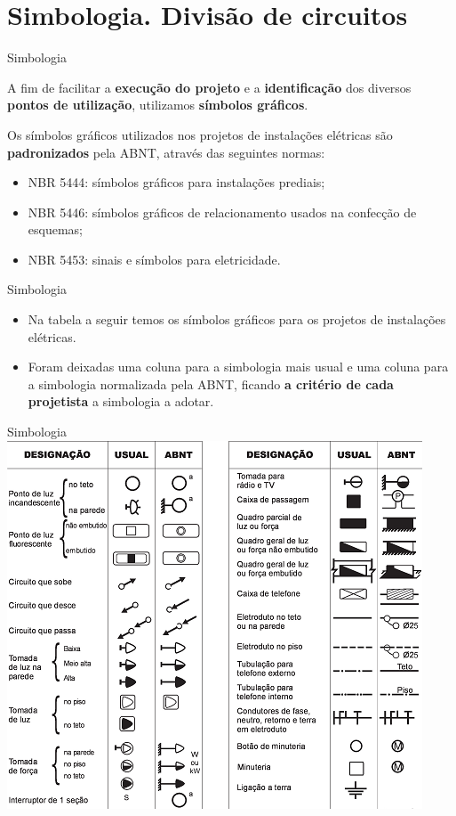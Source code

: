 \section{Simbologia. Divisão de circuitos}

\begin{frame}{Simbologia}
	\begin{block}{}
		A fim de facilitar a \textbf{execução do projeto} e a \textbf{identificação} dos diversos \textbf{pontos de utilização}, utilizamos \textbf{símbolos gráficos}.

		\medskip

		Os símbolos gráficos utilizados nos projetos de instalações elétricas são \textbf{padronizados} pela ABNT, através das seguintes normas:
		\begin{itemize}
			\item NBR 5444: símbolos gráficos para instalações prediais;
			\item NBR 5446: símbolos gráficos de relacionamento usados na confecção de esquemas;
			\item NBR 5453: sinais e símbolos para eletricidade.
		\end{itemize}
	\end{block}
\end{frame}


\begin{frame}{Simbologia}
	\begin{block}{}
		\begin{itemize}
			\item Na tabela a seguir temos os símbolos gráficos para os projetos de instalações elétricas.
			\item Foram deixadas uma coluna para a simbologia mais usual e uma coluna para a simbologia normalizada pela ABNT, ficando \textbf{a critério de cada projetista }a simbologia a adotar.
		\end{itemize}
	\end{block}


\end{frame}


\begin{frame}{Simbologia}
	\centering
	\includegraphics[width=0.74\linewidth]{Figuras/Ch05/fig1}
\end{frame}


